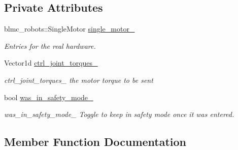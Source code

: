 \subsection*{Private Attributes}
\begin{DoxyCompactItemize}
\item 
blmc\+\_\+robots\+::\+Single\+Motor \hyperlink{classdg__blmc__robots_1_1DGMSingleMotor_abd548dc88f1ded74bafea823244de422}{single\+\_\+motor\+\_\+}
\begin{DoxyCompactList}\small\item\em Entries for the real hardware. \end{DoxyCompactList}\item 
Vector1d \hyperlink{classdg__blmc__robots_1_1DGMSingleMotor_a6c092a7682bf6511d68c86f4b0ba51ea}{ctrl\+\_\+joint\+\_\+torques\+\_\+}\hypertarget{classdg__blmc__robots_1_1DGMSingleMotor_a6c092a7682bf6511d68c86f4b0ba51ea}{}\label{classdg__blmc__robots_1_1DGMSingleMotor_a6c092a7682bf6511d68c86f4b0ba51ea}

\begin{DoxyCompactList}\small\item\em ctrl\+\_\+joint\+\_\+torques\+\_\+ the motor torque to be sent \end{DoxyCompactList}\item 
bool \hyperlink{classdg__blmc__robots_1_1DGMSingleMotor_af341e50979dab7f63f4cf9b27e3fd772}{was\+\_\+in\+\_\+safety\+\_\+mode\+\_\+}\hypertarget{classdg__blmc__robots_1_1DGMSingleMotor_af341e50979dab7f63f4cf9b27e3fd772}{}\label{classdg__blmc__robots_1_1DGMSingleMotor_af341e50979dab7f63f4cf9b27e3fd772}

\begin{DoxyCompactList}\small\item\em was\+\_\+in\+\_\+safety\+\_\+mode\+\_\+ Toggle to keep in safety mode once it was entered. \end{DoxyCompactList}\end{DoxyCompactItemize}


\subsection{Member Function Documentation}
